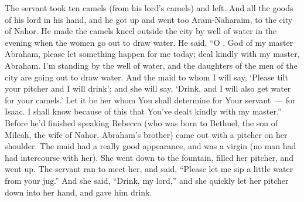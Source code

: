 \begin{inparaenum}
   The servant took ten camels (from his lord's camels) and left. And all the goods of his lord in his hand, and he got up and went too Aram-Naharaim, to the city of Nahor.%
   He made the camels kneel outside the city by well of water in the evening when the women go out to draw water.%
   He said, ``O \lord, God of my master Abraham, please let something happen for me today; deal kindly with my master, Abraham.%
   I'm standing by the well of water, and the daughters of the men of the city are going out to draw water.%
   And the maid to whom I will say, `Please tilt your pitcher and I will drink'; and she will say, `Drink, and I will also get water for your camels.' Let it be her whom You shall determine for Your servant~--- for Isaac. I shall know because of this that You've dealt kindly with my master.''%
   Before he'd finished speaking Rebecca (who was born to Bethuel, the son of Milcah, the wife of Nahor, Abraham's brother) came out with a pitcher on her shoulder.%
   The maid had a really good appearance, and was a virgin (no man had had intercourse with her). She went down to the fountain, filled her pitcher, and went up.%
   The servant ran to meet her, and said, ``Please let me sip a little water from your jug.''%
   And she said, ``Drink, my lord,'' and she quickly let her pitcher down into her hand, and gave him drink.%

\end{inparaenum}
